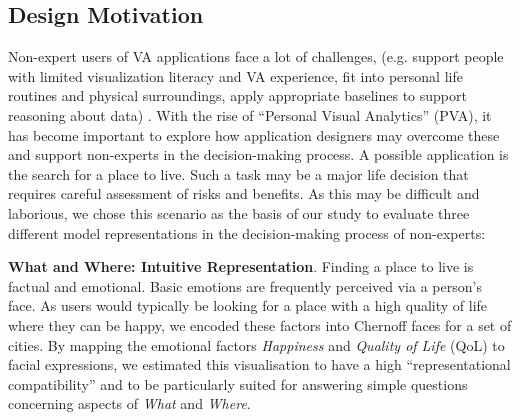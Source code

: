 \documentclass[final,5p,times,twocolumn,authoryear]{elsarticle}
\newcommand{\q}[1]{``#1''}
\begin{document}
\subsection{Design Motivation} %
\label{sec:design_motivation}



Non-expert users of VA applications face a lot of challenges, (e.g. support people with limited visualization
literacy and VA experience, fit into personal life routines and physical surroundings, apply appropriate baselines to support reasoning about data) \citep{kwon2011visual,huang2015personal}. With the rise of \q{Personal Visual Analytics} (PVA), it has become important to explore how application designers may overcome these and support non-experts in the decision-making process. A possible application is the search for a place to live. Such a task may be a major life decision that requires careful assessment of risks and benefits. As this may be difficult and laborious, we chose this scenario as the basis of our study to evaluate three different model representations in the decision-making process of non-experts:

\noindent \textbf{What and Where: Intuitive Representation}.
Finding a place to live is factual and emotional. Basic emotions are frequently perceived via a person's face. As users would typically be looking for a place with a high quality of life where they can be happy, we encoded these factors into Chernoff faces \citep{chernoff_use_1973} for a set of cities. By mapping the emotional factors \emph{Happiness} and \emph{Quality of Life} (QoL) to facial expressions, we estimated this visualisation to have a high ``representational compatibility'' \citep{sparrow_graphical_1989} and to be particularly suited for answering simple questions concerning aspects of \emph{What} and \emph{Where}.


\end{document}

